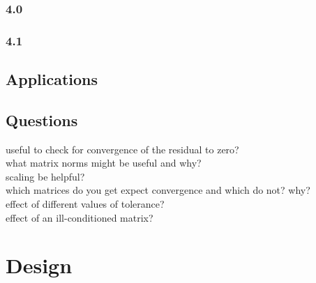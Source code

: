 \documentclass[paper=a4, fontsize=10pt]{article} %
\begin{document}
\subsubsection{4.0}
\subsubsection{4.1}

\subsection{Applications}

\subsection{Questions}
useful to check for convergence of the residual to zero?\\
what matrix norms might be useful and why?\\
scaling be helpful?\\
which matrices do you get expect convergence and which do not? why?\\
effect of different values of tolerance?\\
effect of an ill-conditioned matrix?\\

\section{Design}
\end{document}
